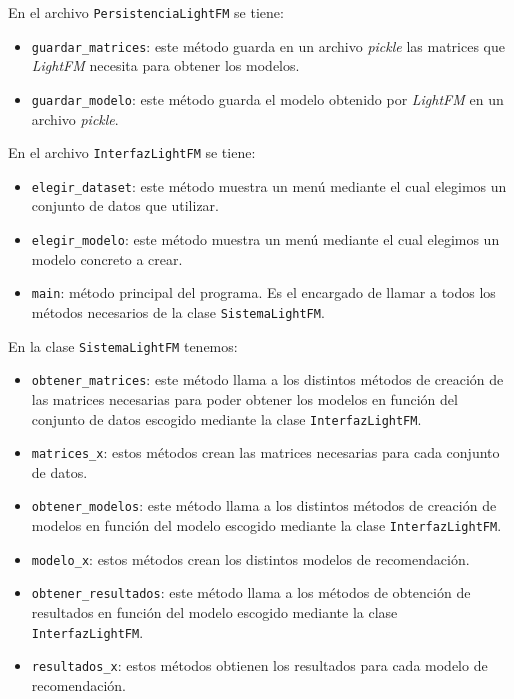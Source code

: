 En el archivo \texttt{PersistenciaLightFM} se tiene:
\begin{itemize}
\tightlist
\item \texttt{guardar\_matrices}: este método guarda en un archivo \textit{pickle} las matrices que \textit{LightFM} necesita para obtener los modelos.
\item \texttt{guardar\_modelo}: este método guarda el modelo obtenido por \textit{LightFM} en un archivo \textit{pickle}.
\end{itemize}

En el archivo \texttt{InterfazLightFM} se tiene:
\begin{itemize}
\tightlist
\item \texttt{elegir\_dataset}: este método muestra un menú mediante el cual elegimos un conjunto de datos que utilizar.
\item \texttt{elegir\_modelo}: este método muestra un menú mediante el cual elegimos un modelo concreto a crear. 
\item \texttt{main}: método principal del programa. Es el encargado de llamar a todos los métodos necesarios de la clase \texttt{SistemaLightFM}. 
\end{itemize}

En la clase \texttt{SistemaLightFM} tenemos:
\begin{itemize}
\tightlist
\item \texttt{obtener\_matrices}: este método llama a los distintos métodos de creación de las matrices necesarias para poder obtener los modelos en función del conjunto de datos escogido mediante la clase \texttt{InterfazLightFM}.
\item \texttt{matrices\_x}: estos métodos crean las matrices necesarias para cada conjunto de datos. 
\item \texttt{obtener\_modelos}: este método llama a los distintos métodos de creación de modelos en función del modelo escogido mediante la clase \texttt{InterfazLightFM}.
\item \texttt{modelo\_x}: estos métodos crean los distintos modelos de recomendación. 
\item \texttt{obtener\_resultados}: este método llama a los métodos de obtención de resultados en función del modelo escogido mediante la clase \texttt{InterfazLightFM}. 
\item \texttt{resultados\_x}: estos métodos obtienen los resultados para cada modelo de recomendación. 
\end{itemize}


